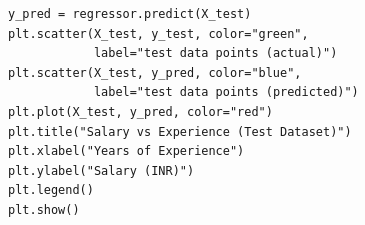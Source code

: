 \begin{vidu}[title={Bước 6: Trực quan tập kiểm tra}]
\begin{lstlisting}
y_pred = regressor.predict(X_test)
plt.scatter(X_test, y_test, color="green",
            label="test data points (actual)")
plt.scatter(X_test, y_pred, color="blue",
            label="test data points (predicted)")
plt.plot(X_test, y_pred, color="red")
plt.title("Salary vs Experience (Test Dataset)")
plt.xlabel("Years of Experience")
plt.ylabel("Salary (INR)")
plt.legend()
plt.show()
\end{lstlisting}

\end{vidu}
